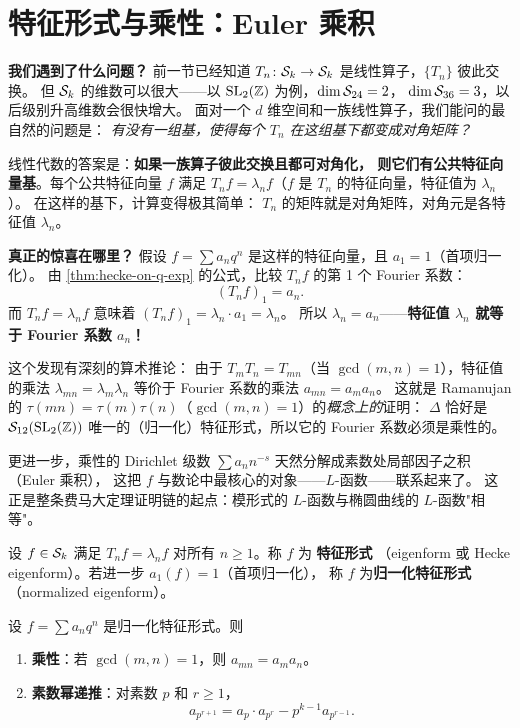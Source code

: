 \section{特征形式与乘性：Euler 乘积}
\label{sec:hecke-eigenforms}

\textbf{我们遇到了什么问题？}
前一节已经知道 $T_n\colon \mathcal{S}_k \to \mathcal{S}_k$ 是线性算子，$\{T_n\}$ 彼此交换。
但 $\mathcal{S}_k$ 的维数可以很大——以 $\mathrm{SL}_2(\mathbb{Z})$ 为例，$\dim \mathcal{S}_{24} = 2$，
$\dim \mathcal{S}_{36} = 3$，以后级别升高维数会很快增大。
面对一个 $d$ 维空间和一族线性算子，我们能问的最自然的问题是：
\emph{有没有一组基，使得每个 $T_n$ 在这组基下都变成对角矩阵？}

线性代数的答案是：\textbf{如果一族算子彼此交换且都可对角化，
则它们有公共特征向量基}。每个公共特征向量 $f$ 满足
$T_n f = \lambda_n f$（$f$ 是 $T_n$ 的特征向量，特征值为 $\lambda_n$）。
在这样的基下，计算变得极其简单：
$T_n$ 的矩阵就是对角矩阵，对角元是各特征值 $\lambda_n$。

\textbf{真正的惊喜在哪里？}
假设 $f = \sum a_n q^n$ 是这样的特征向量，且 $a_1 = 1$（首项归一化）。
由 \cref{thm:hecke-on-q-exp} 的公式，比较 $T_n f$ 的第 1 个 Fourier 系数：
\[
  (T_n f)_1 = a_n.
\]
而 $T_n f = \lambda_n f$ 意味着 $(T_n f)_1 = \lambda_n \cdot a_1 = \lambda_n$。
所以 $\lambda_n = a_n$——\textbf{特征值 $\lambda_n$ 就等于 Fourier 系数 $a_n$！}

这个发现有深刻的算术推论：
由于 $T_m T_n = T_{mn}$（当 $\gcd(m,n)=1$），特征值的乘法 $\lambda_{mn} = \lambda_m \lambda_n$
等价于 Fourier 系数的乘法 $a_{mn} = a_m a_n$。
这就是 Ramanujan 的 $\tau(mn) = \tau(m)\tau(n)$（$\gcd(m,n)=1$）的\emph{概念上的}证明：
$\Delta$ 恰好是 $\mathcal{S}_{12}(\mathrm{SL}_2(\mathbb{Z}))$ 唯一的（归一化）特征形式，所以它的 Fourier 系数必须是乘性的。

更进一步，乘性的 Dirichlet 级数 $\sum a_n n^{-s}$ 天然分解成素数处局部因子之积（Euler 乘积），
这把 $f$ 与数论中最核心的对象——$L$-函数——联系起来了。
这正是整条费马大定理证明链的起点：模形式的 $L$-函数与椭圆曲线的 $L$-函数"相等"。

\begin{definition}[特征形式]
\label{def:eigenform}
设 $f \in \mathcal{S}_k$ 满足 $T_n f = \lambda_n f$ 对所有 $n \geq 1$。称 $f$ 为 \textbf{特征形式}
（eigenform 或 Hecke eigenform）。若进一步 $a_1(f) = 1$（首项归一化），
称 $f$ 为\textbf{归一化特征形式}（normalized eigenform）。
\end{definition}

\begin{theorem}[乘性定理]
\label{thm:multiplicativity}
设 $f = \sum a_n q^n$ 是归一化特征形式。则
\begin{enumerate}
  \item[(i)] \textbf{乘性}：若 $\gcd(m,n)=1$，则 $a_{mn} = a_m a_n$。
  \item[(ii)] \textbf{素数幂递推}：对素数 $p$ 和 $r \geq 1$，
        \[
          a_{p^{r+1}} = a_p \cdot a_{p^r} - p^{k-1} a_{p^{r-1}}.
        \]
\end{enumerate}
\end{theorem}

